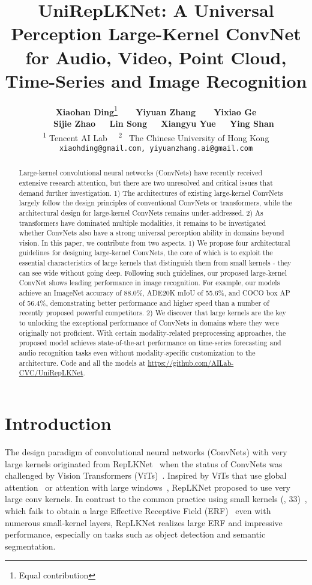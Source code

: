 \documentclass[10pt,twocolumn,letterpaper]{article}
\title{UniRepLKNet: A Universal Perception Large-Kernel ConvNet for Audio, Video, Point Cloud, Time-Series and Image Recognition}
\author{
	\textbf{Xiaohan Ding}\thanks{Equal contribution}
	~~~ \textbf{Yiyuan Zhang}
	~~~ \textbf{Yixiao Ge}\\
	~~~ \textbf{Sijie Zhao}
        \quad \quad~~ \textbf{Lin Song}
        \quad \quad~~ \textbf{Xiangyu Yue}
	\quad \quad~~ \textbf{Ying Shan} \\
	\textsuperscript{1} Tencent AI Lab
        \quad 
	~~\textsuperscript{2}~ The Chinese University of Hong Kong\\
	{\tt\small xiaohding@gmail.com,
        yiyuanzhang.ai@gmail.com} 
}
\begin{document}
\maketitle
\begin{abstract}
Large-kernel convolutional neural networks (ConvNets) have recently received extensive research attention, but there are two unresolved and critical issues that demand further investigation. 1) The architectures of existing large-kernel ConvNets largely follow the design principles of conventional ConvNets or transformers, while the architectural design for large-kernel ConvNets remains under-addressed. 2) As transformers have dominated multiple modalities, it remains to be investigated whether ConvNets also have a strong universal perception ability in domains beyond vision. In this paper, we contribute from two aspects. 1) We propose four architectural guidelines for designing large-kernel ConvNets, the core of which is to exploit the essential characteristics of large kernels that distinguish them from small kernels - they can see wide without going deep. Following such guidelines, our proposed large-kernel ConvNet shows leading performance in image recognition. For example, our models achieve an ImageNet accuracy of 88.0\%, ADE20K mIoU of 55.6\%, and COCO box AP of 56.4\%, demonstrating better performance and higher speed than a number of recently proposed powerful competitors. 2) We discover that large kernels are the key to unlocking the exceptional performance of ConvNets in domains where they were originally not proficient. With certain modality-related preprocessing approaches, the proposed model achieves state-of-the-art performance on time-series forecasting and audio recognition tasks even without modality-specific customization to the architecture. Code and all the models at \url{https://github.com/AILab-CVC/UniRepLKNet}.
\end{abstract} \section{Introduction}
\label{sec:intro}

The design paradigm of convolutional neural networks (ConvNets) with very large kernels originated from RepLKNet~\cite{ding2022scaling} when the status of ConvNets was challenged by Vision Transformers (ViTs)~\cite{vit,swin,deit,pvt}. Inspired by ViTs that use global attention~\cite{vit,pvt,bot} or attention with large windows~\cite{swin,halonet,sasa}, RepLKNet proposed to use very large conv kernels. In contrast to the common practice using small kernels (\eg, 33)~\cite{simonyan2014very,he2016deep,zhang2018shufflenet,mbv1,huang2017densely,efficientnet,regnet}, which fails to obtain a large Effective Receptive Field (ERF)~\cite{erf} even with numerous small-kernel layers, RepLKNet realizes large ERF and impressive performance, especially on tasks such as object detection and semantic segmentation. 
\end{document}
